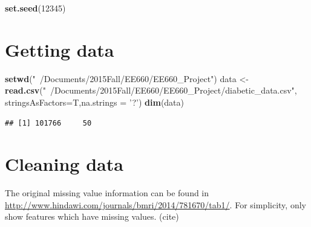 \documentclass[]{article}
\newenvironment{Shaded}{\begin{snugshade}}{\end{snugshade}}
\newcommand{\KeywordTok}[1]{\textcolor[rgb]{0.13,0.29,0.53}{\textbf{{#1}}}}
\newcommand{\DataTypeTok}[1]{\textcolor[rgb]{0.13,0.29,0.53}{{#1}}}
\newcommand{\DecValTok}[1]{\textcolor[rgb]{0.00,0.00,0.81}{{#1}}}
\newcommand{\StringTok}[1]{\textcolor[rgb]{0.31,0.60,0.02}{{#1}}}
\newcommand{\NormalTok}[1]{{#1}}
\begin{document}
\begin{Shaded}
\begin{Highlighting}[]
\KeywordTok{set.seed}\NormalTok{(}\DecValTok{12345}\NormalTok{)}
\end{Highlighting}
\end{Shaded}

\section{Getting data}\label{getting-data}

\begin{Shaded}
\begin{Highlighting}[]
\KeywordTok{setwd}\NormalTok{(}\StringTok{"~/Documents/2015Fall/EE660/EE660_Project"}\NormalTok{)}
\NormalTok{data <-}\StringTok{ }\KeywordTok{read.csv}\NormalTok{(}\StringTok{"~/Documents/2015Fall/EE660/EE660_Project/diabetic_data.csv"}\NormalTok{,}
                 \DataTypeTok{stringsAsFactors=}\NormalTok{T,}\DataTypeTok{na.strings =} \StringTok{'?'}\NormalTok{)}
\KeywordTok{dim}\NormalTok{(data)}
\end{Highlighting}
\end{Shaded}

\begin{verbatim}
## [1] 101766     50
\end{verbatim}

\section{Cleaning data}\label{cleaning-data}

The original missing value information can be found in
\url{http://www.hindawi.com/journals/bmri/2014/781670/tab1/}. For
simplicity, only show features which have missing values. (cite)
\end{document}
